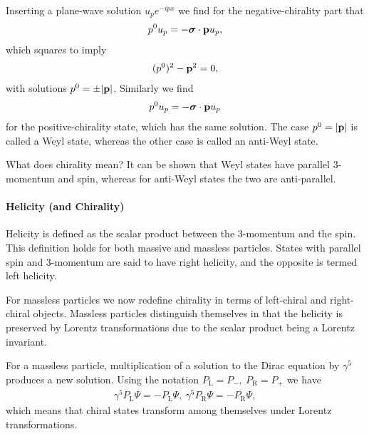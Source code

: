 Inserting a plane-wave solution $u_{p}e^{-ipx}$ we find for the negative-chirality part that
\begin{align*}
	p^{0}u_{p} = -\vb*{\sigma}\cdot\vb{p}u_{p},
\end{align*}
which squares to imply
\begin{align*}
	(p^{0})^{2} - \vb{p}^{2} = 0,
\end{align*}
with solutions $p^{0} = \pm\abs{\vb{p}}$. Similarly we find
\begin{align*}
	p^{0}u_{p} = -\vb*{\sigma}\cdot\vb{p}u_{p}
\end{align*}
for the positive-chirality state, which has the same solution. The case $p^{0} = \abs{\vb{p}}$ is called a Weyl state, whereas the other case is called an anti-Weyl state.

What does chirality mean? It can be shown that Weyl states have parallel 3-momentum and spin, whereas for anti-Weyl states the two are anti-parallel.

\paragraph{Helicity (and Chirality)}
Helicity is defined as the scalar product between the 3-momentum and the spin. This definition holds for both massive and massless particles. States with parallel spin and 3-momentum are said to have right helicity, and the opposite is termed left helicity.

For massless particles we now redefine chirality in terms of left-chiral and right-chiral objects. Massless particles distinguish themselves in that the helicity is preserved by Lorentz transformations due to the scalar product being a Lorentz invariant.

For a massless particle, multiplication of a solution to the Dirac equation by $\gamma^{5}$ produces a new solution. Using the notation $P_{\text{L}} = P_{-},\ P_{\text{R}} = P_{+}$ we have
\begin{align*}
	\gamma^{5}P_{\text{L}}\Psi = -P_{\text{L}}\Psi,\ \gamma^{5}P_{\text{R}}\Psi = -P_{\text{R}}\Psi,
\end{align*}
which means that chiral states transform among themselves under Lorentz transformations.